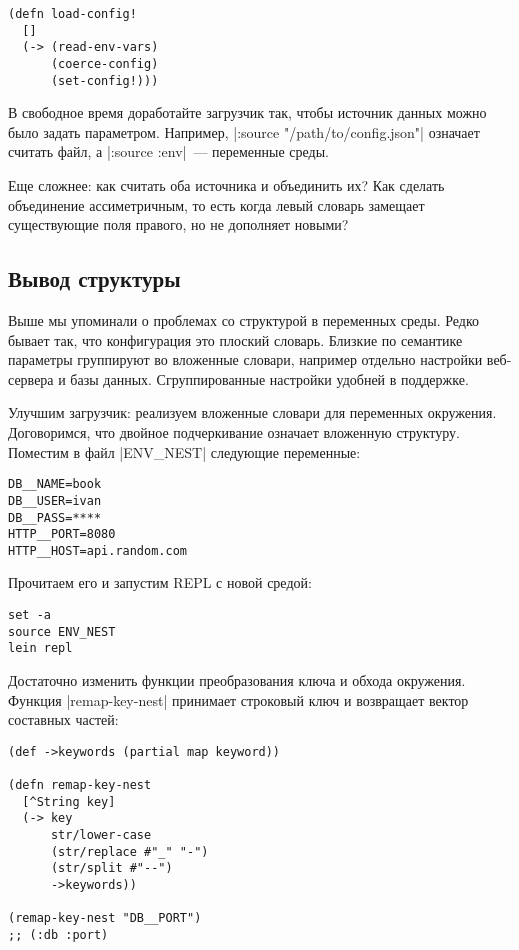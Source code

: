 \begin{verbatim}
(defn load-config!
  []
  (-> (read-env-vars)
      (coerce-config)
      (set-config!)))
\end{verbatim}

В свободное время доработайте загрузчик так, чтобы источник данных можно было
задать параметром. Например, \spverb|:source "/path/to/config.json"| означает считать
файл, а \spverb|:source :env|~--- переменные среды.

Еще сложнее: как считать оба источника и объединить их? Как сделать объединение
ассиметричным, то есть когда левый словарь замещает существующие поля правого,
но не дополняет новыми?

\subsection{Вывод структуры}

Выше мы упоминали о проблемах со структурой в переменных среды. Редко бывает
так, что конфигурация это плоский словарь. Близкие по семантике параметры
группируют во вложенные словари, например отдельно настройки веб-сервера и базы
данных. Сгруппированные настройки удобней в поддержке.

Улучшим загрузчик: реализуем вложенные словари для переменных
окружения. Договоримся, что двойное подчеркивание означает вложенную
структуру. Поместим в файл \spverb|ENV_NEST| следующие переменные:

\begin{verbatim}
DB__NAME=book
DB__USER=ivan
DB__PASS=****
HTTP__PORT=8080
HTTP__HOST=api.random.com
\end{verbatim}

Прочитаем его и запустим REPL с новой средой:

\begin{verbatim}
set -a
source ENV_NEST
lein repl
\end{verbatim}

Достаточно изменить функции преобразования ключа и обхода окружения. Функция
\spverb|remap-key-nest| принимает строковый ключ и возвращает вектор составных частей:

\begin{verbatim}
(def ->keywords (partial map keyword))

(defn remap-key-nest
  [^String key]
  (-> key
      str/lower-case
      (str/replace #"_" "-")
      (str/split #"--")
      ->keywords))

(remap-key-nest "DB__PORT")
;; (:db :port)
\end{verbatim}

